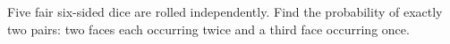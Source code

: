 Five fair six-sided dice are rolled independently. Find the probability of exactly two pairs: two faces each occurring twice and a third face occurring once.
